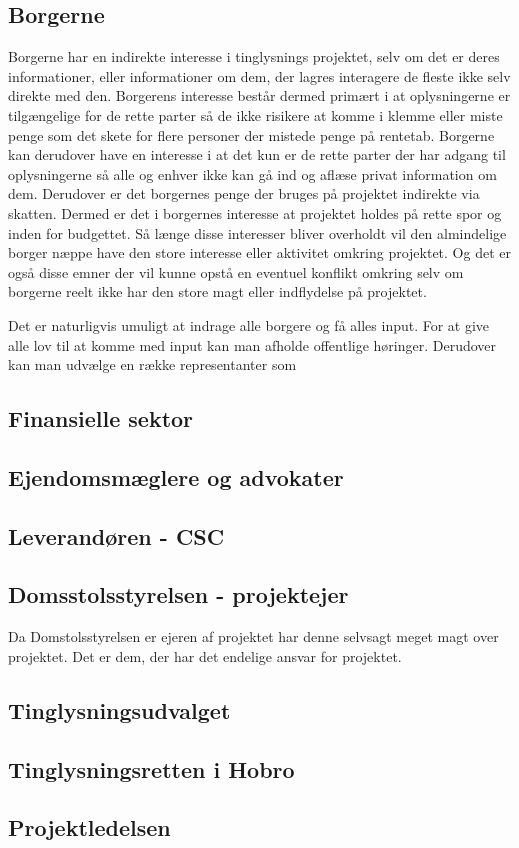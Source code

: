 \documentclass[10pt,a4paper,danish]{article}
\begin{document}
\subsection{Borgerne}
Borgerne har en indirekte interesse i tinglysnings projektet, selv om det er
deres informationer, eller informationer om dem, der lagres interagere de fleste ikke
selv direkte med den. Borgerens interesse består dermed primært i at
oplysningerne er tilgængelige for de rette parter så de ikke risikere at komme i
klemme eller miste penge som det skete for flere personer der mistede penge på
rentetab. Borgerne kan derudover have en interesse i at det kun er de rette
parter der har adgang til oplysningerne så alle og enhver ikke kan gå ind og
aflæse privat information om dem.
Derudover er det borgernes penge der bruges på projektet indirekte via skatten.
Dermed er det i borgernes interesse at projektet holdes på rette spor og inden
for budgettet.
Så længe disse interesser bliver overholdt vil den almindelige borger næppe
have den store interesse eller aktivitet omkring projektet.
Og det er også disse emner der vil kunne opstå en eventuel konflikt omkring selv
om borgerne reelt ikke har den store magt eller indflydelse på projektet.

Det er naturligvis umuligt at indrage alle borgere og få alles input.
For at give alle lov til at komme med input kan man afholde offentlige
høringer. Derudover kan man udvælge en række representanter som

\subsection{Finansielle sektor}


\subsection{Ejendomsmæglere og advokater}


\subsection{Leverandøren - CSC}


\subsection{Domsstolsstyrelsen - projektejer}
Da Domstolsstyrelsen er ejeren af projektet har denne selvsagt meget magt over projektet. Det er dem, der har det endelige ansvar for projektet.


\subsection{Tinglysningsudvalget}


\subsection{Tinglysningsretten i Hobro}


\subsection{Projektledelsen}
\end{document}
